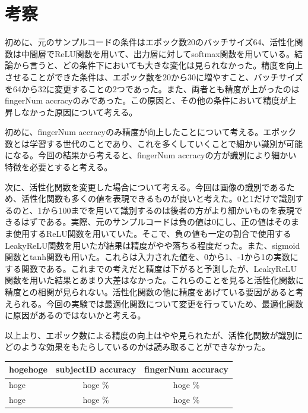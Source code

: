 \documentclass[a4paper, 11pt, titlepage]{jsarticle}
\begin{document}
\section{考察}
初めに、元のサンプルコードの条件はエポック数20のバッチサイズ64、活性化関数は中間層でReLU関数を用いて、出力層に対してsoftmax関数を用いている。結論から言うと、どの条件下においても大きな変化は見られなかった。精度を向上させることができた条件は、エポック数を20から30に増やすこと、バッチサイズを64から32に変更することの2つであった。また、両者とも精度が上がったのは fingerNum accracyのみであった。この原因と、その他の条件において精度が上昇しなかった原因について考える。

初めに、fingerNum accracyのみ精度が向上したことについて考える。エポック数とは学習する世代のことであり、これを多くしていくことで細かい識別が可能になる。今回の結果から考えると、fingerNum accracyの方が識別により細かい特徴を必要とすると考える。

次に、活性化関数を変更した場合について考える。今回は画像の識別であるため、活性化関数も多くの値を表現できるものが良いと考えた。0と1だけで識別するのと、1から100までを用いて識別するのは後者の方がより細かいものを表現できるはずである。実際、元のサンプルコードは負の値は0にし、正の値はそのまま使用するReLU関数を用いていた。そこで、負の値も一定の割合で使用するLeakyReLU関数を用いたが結果は精度がやや落ちる程度だった。また、sigmoid関数とtanh関数も用いた。これらは入力された値を、0から1、-1から1の実数にする関数である。これまでの考えだと精度は下がると予測したが、LeakyReLU関数を用いた結果とあまり大差はなかった。これらのことを見ると活性化関数に精度との相関が見られない。活性化関数の他に精度をあげている要因があると考えられる。今回の実験では最適化関数について変更を行っていため、最適化関数に原因があるのではないかと考える。

以上より、エポック数による精度の向上はやや見られたが、活性化関数が識別にどのような効果をもたらしているのかは読み取ることができなかった。

\begin{table}[htb]
  \begin{tabular}{|l|c|c|}
    \hline
    hogehoge & subjectID accuracy & fingerNum accuracy  \\ \hline
    hoge & hoge \% & hoge \% \\ \hline
    hoge & hoge \% & hoge \% \\ \hline
  \end{tabular}
\end{table}
\end{document}

